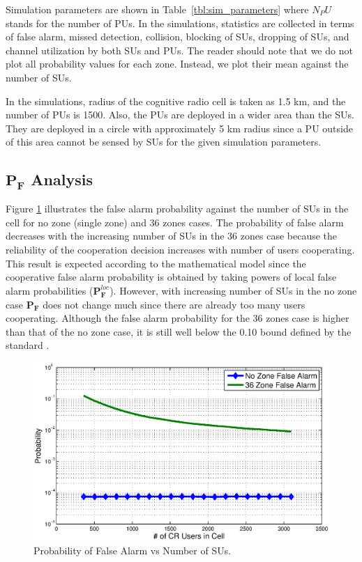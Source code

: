 \documentclass[conference,compsoc]{IEEEtran}
\newcommand{\probf}{\mathbf{P_F}}
\newcommand{\probflocal}{\mathbf{P}_\mathbf{F}^{loc}}
\newcommand{\CR}{cognitive radio }
\begin{document}
Simulation parameters are shown in Table~\ref{tbl:sim_parameters} where $N_PU$ stands for the number of PUs. In the simulations, statistics are collected in terms of false alarm, missed detection, collision, blocking of SUs, dropping of SUs, and channel utilization by both SUs and PUs. The reader should note that we do not plot all probability values for each zone. Instead, we plot their mean against the number of SUs.

In the simulations, radius of the \CR cell is taken as 1.5 km, and the number of PUs is 1500. Also, the PUs are deployed in a wider area than the SUs. They are deployed in a circle with approximately 5 km radius since a PU outside of this area cannot be sensed by SUs for the given simulation parameters.

\subsection{$\probf$ Analysis}
Figure \ref{fig:probf} illustrates the false alarm probability against the number of SUs in the cell for no zone (single zone) and 36 zones cases. The probability of false alarm decreases with the increasing number of SUs in the 36 zones case because the reliability of the cooperation decision increases with number of users cooperating. This result is expected according to the mathematical model since the cooperative false alarm probability is obtained by taking powers of local false alarm probabilities ($\probflocal$). However, with increasing number of SUs in the no zone case  $\probf$ does not change much since there are already too many users cooperating. Although the false alarm probability for the 36 zones case is higher than that of the no zone case, it is still well below the 0.10 bound defined by the standard \cite{wranstandard}.

\begin{figure}[t]
\centering
\includegraphics[width=0.99\columnwidth,keepaspectratio] {figs/pf.eps}
\caption{Probability of False Alarm vs Number of SUs.}
\label{fig:probf}
\end{figure}
\end{document}
